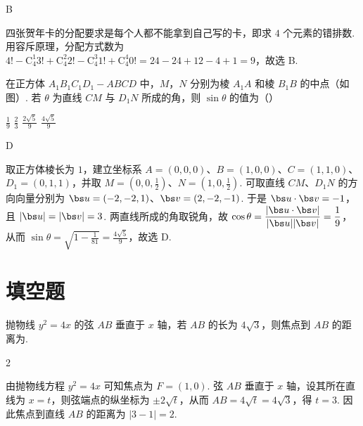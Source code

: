 \begin{answer}
B
\end{answer}

\begin{solution}
四张贺年卡的分配要求是每个人都不能拿到自己写的卡，即求 \(4\) 个元素的错排数. 用容斥原理，分配方式数为
\(\displaystyle 4!-\mathrm C_4^1 3!+\mathrm C_4^2 2!-\mathrm C_4^3 1!+\mathrm C_4^4 0!=24-24+12-4+1=9\)，故选 B.
\end{solution}

\begin{problem}
在正方体 \(A_{1}B_{1}C_{1}D_{1}-ABCD\) 中，\(M\)，\(N\) 分别为棱 \(A_{1}A\) 和棱 \(B_{1}B\) 的中点（如图）. 若 \(\theta\) 为直线 \(CM\) 与 \(D_{1}N\) 所成的角，则 \(\sin \theta\) 的值为（\quad）


\choices
    {\(\frac{1}{9}\)}
    {\(\frac{2}{3}\)}
    {\(\frac{2\sqrt{5}}{9}\)}
    {\(\frac{4\sqrt{5}}{9}\)}
\end{problem}

\begin{answer}
D
\end{answer}

\begin{solution}
取正方体棱长为 \(1\)，建立坐标系
\(A=(0,0,0)\)、\(B=(1,0,0)\)、\(C=(1,1,0)\)、\(D_1=(0,1,1)\)，并取 \(M=(0,0,\frac{1}{2})\)、\(N=(1,0,\frac{1}{2})\). 可取直线 \(CM\)、\(D_1N\) 的方向向量分别为 \(\bs u=(-2,-2,1)\)、\(\bs v=(2,-2,-1)\). 于是 \(\bs u\cdot\bs v=-1\)，且 \(|\bs u|=|\bs v|=3\). 两直线所成的角取锐角，故 \(\displaystyle \cos\theta=\frac{|\bs u\cdot\bs v|}{|\bs u||\bs v|}=\frac{1}{9}\)，从而 \(\displaystyle \sin\theta=\sqrt{1-\frac{1}{81}}=\frac{4\sqrt{5}}{9}\)，故选 D.
\end{solution}

\section{填空题}

\begin{problem}
抛物线 \(y^2 = 4x\) 的弦 \(AB\) 垂直于 \(x\) 轴，若 \(AB\) 的长为 \(4\sqrt{3}\)，则焦点到 \(AB\) 的距离为\fillinblank{}.
\end{problem}

\begin{answer}
2
\end{answer}

\begin{solution}
由抛物线方程 \(y^2=4x\) 可知焦点为 \(F=(1,0)\). 弦 \(AB\) 垂直于 \(x\) 轴，设其所在直线为 \(x=t\)，则弦端点的纵坐标为 \(\pm2\sqrt{t}\)，从而 \(AB=4\sqrt{t}=4\sqrt{3}\)，得 \(t=3\). 因此焦点到直线 \(AB\) 的距离为 \(|3-1|=2\).
\end{solution}

